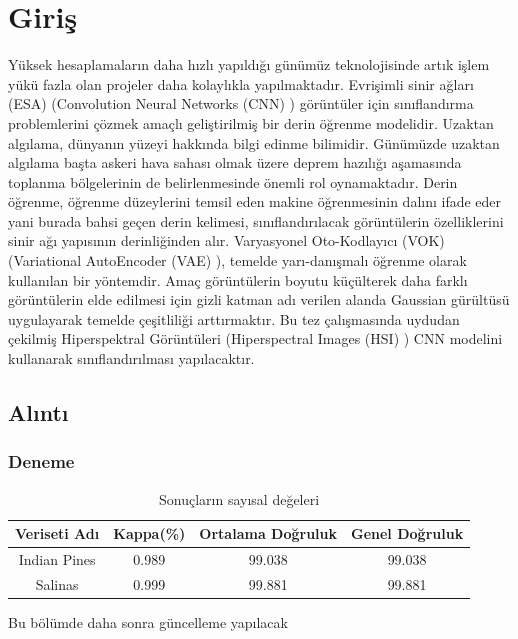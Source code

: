 \chapter{Giriş}
Yüksek hesaplamaların daha hızlı yapıldığı günümüz teknolojisinde artık işlem yükü fazla olan projeler daha kolaylıkla yapılmaktadır. Evrişimli sinir ağları (ESA) (Convolution Neural Networks (CNN) ) görüntüler için sınıflandırma problemlerini çözmek amaçlı geliştirilmiş bir derin öğrenme modelidir. Uzaktan algılama, dünyanın yüzeyi hakkında bilgi edinme bilimidir. Günümüzde uzaktan algılama başta askeri hava sahası olmak üzere deprem hazılığı aşamasında toplanma bölgelerinin de belirlenmesinde önemli rol oynamaktadır. Derin öğrenme, öğrenme düzeylerini temsil eden makine öğrenmesinin dalını ifade eder yani burada bahsi geçen derin kelimesi, sınıflandırılacak görüntülerin özelliklerini sinir ağı yapısının derinliğinden alır. Varyasyonel Oto-Kodlayıcı (VOK) (Variational AutoEncoder (VAE) ), temelde yarı-danışmalı öğrenme olarak kullanılan bir yöntemdir. Amaç görüntülerin boyutu küçülterek daha farklı görüntülerin elde edilmesi için gizli katman adı verilen alanda Gaussian gürültüsü uygulayarak temelde çeşitliliği arttırmaktır. Bu tez çalışmasında uydudan çekilmiş Hiperspektral Görüntüleri (Hiperspectral Images (HSI) ) CNN modelini kullanarak sınıflandırılması yapılacaktır.
\section{Alıntı}

\subsection{Deneme}

\begin{table}[!ht]
\centering
    \begin{threeparttable} %
    \caption{Sonuçların sayısal değeleri}
        \begin{tabular}{|c|c|c|c|}
        \hline
        \textbf{Veriseti Adı} & \textbf{Kappa(\%)} & \textbf{Ortalama Doğruluk} & \textbf{Genel Doğruluk} \\ \hline
        Indian Pines & 0.989    & 99.038           & 99.038         \\ \hline
        Salinas & 0.999    & 99.881          & 99.881         \\ \hline
        \end{tabular}
    \end{threeparttable} %
\end{table}
Bu bölümde daha sonra güncelleme yapılacak

